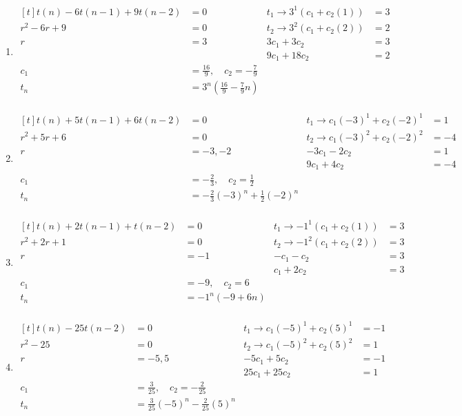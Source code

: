 \begin{enumerate}[leftmargin=2cm,labelsep=.5cm,label=\bf\arabic*.]
\begin{enumerate}
\item $
\begin{aligned}[t]
t(n) - 6t(n-1) + 9t(n-2) &= 0 & t_1 \rightarrow 3^1(c_1 + c_2(1)) &= 3 \\
r^2 - 6r + 9 &= 0             & t_2 \rightarrow 3^2(c_1 + c_2(2)) &= 2 \\
r &= 3                        & 3c_1 + 3c_2 &= 3 \\
&                             & 9c_1 + 18c_2 &= 2 \\[2mm]
c_1 &= \frac{16}{9}, \quad c_2 = -\frac{7}{9}  & & \\
t_n &= 3^n\left(\frac{16}{9} - \frac{7}{9}n\right) \\[1cm]
\end{aligned} $

\item $
\begin{aligned}[t]
t(n) + 5t(n-1) + 6t(n-2) &= 0 & t_1 \rightarrow c_1(-3)^1 + c_2(-2)^1 &= 1 \\
r^2 + 5r + 6 &= 0             & t_2 \rightarrow c_1(-3)^2 + c_2(-2)^2 &= -4 \\
r &= -3, -2                   & -3c_1 - 2c_2 &= 1 \\
&                             & 9c_1 + 4c_2 &= -4 \\[2mm]
c_1 &= -\frac{2}{3}, \quad c_2 = \frac{1}{2}  & & \\
t_n &= -\frac{2}{3}(-3)^n + \frac{1}{2}(-2)^n \\[1cm]
\end{aligned} $

\item $
\begin{aligned}[t]
t(n) + 2t(n-1) + t(n-2) &= 0  & t_1 \rightarrow -1^1(c_1 + c_2(1)) &= 3 \\
r^2 + 2r + 1 &= 0             & t_2 \rightarrow -1^2(c_1 + c_2(2)) &= 3 \\
r &= -1                       & -c_1 - c_2 &= 3 \\
&                             & c_1 + 2c_2 &= 3 \\[2mm]
c_1 &= -9, \quad c_2 = 6  & & \\
t_n &= -1^n(-9 + 6n) \\[1cm]
\end{aligned} $

\item $
\begin{aligned}[t]
t(n) - 25t(n-2) &= 0          & t_1 \rightarrow c_1(-5)^1 + c_2(5)^1 &= -1 \\
r^2 - 25 &= 0                 & t_2 \rightarrow c_1(-5)^2 + c_2(5)^2 &= 1 \\
r &= -5, 5                    & -5c_1 + 5c_2 &= -1 \\
&                             & 25c_1 + 25c_2 &= 1 \\[2mm]
c_1 &= \frac{3}{25}, \quad c_2 = -\frac{2}{25}  & & \\
t_n &= \frac{3}{25}(-5)^n -\frac{2}{25}(5)^n \\[1cm]
\end{aligned} $
\end{enumerate}


\end{enumerate}
